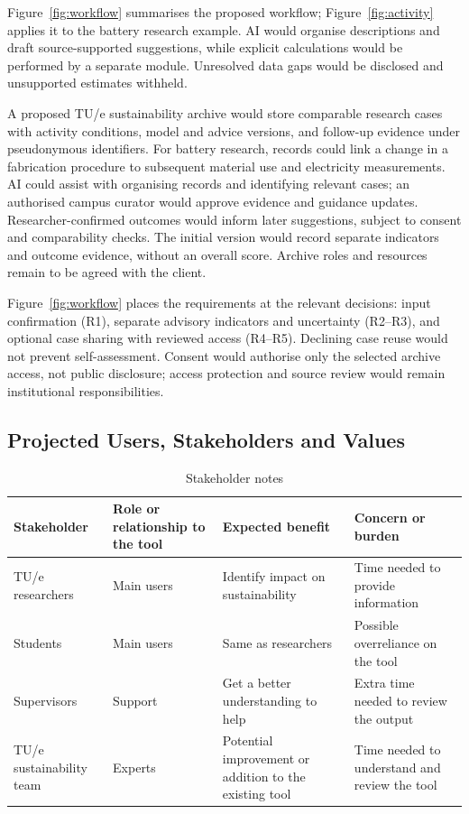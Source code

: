 Figure~\ref{fig:workflow} summarises the proposed workflow; Figure~\ref{fig:activity} applies it to the battery research example. AI would organise descriptions and draft source-supported suggestions, while explicit calculations would be performed by a separate module. Unresolved data gaps would be disclosed and unsupported estimates withheld.

A proposed TU/e sustainability archive would store comparable research cases with activity conditions, model and advice versions, and follow-up evidence under pseudonymous identifiers. For battery research, records could link a change in a fabrication procedure to subsequent material use and electricity measurements. AI could assist with organising records and identifying relevant cases; an authorised campus curator would approve evidence and guidance updates. Researcher-confirmed outcomes would inform later suggestions, subject to consent and comparability checks. The initial version would record separate indicators and outcome evidence, without an overall score. Archive roles and resources remain to be agreed with the client.

Figure~\ref{fig:workflow} places the requirements at the relevant decisions: input confirmation (R1), separate advisory indicators and uncertainty (R2--R3), and optional case sharing with reviewed access (R4--R5). Declining case reuse would not prevent self-assessment. Consent would authorise only the selected archive access, not public disclosure; access protection and source review would remain institutional responsibilities.




\FloatBarrier
\subsection{Projected Users, Stakeholders and Values}
\begin{table}[ht]
\centering
\begin{tabularx}{\textwidth}{|X|X|X|X|}
\hline
\textbf{Stakeholder} & \textbf{Role or relationship to the tool} & 
\textbf{Expected benefit} & \textbf{Concern or burden} \\
\hline

TU/e researchers &
Main users &
Identify impact on sustainability &
Time needed to provide information \\
\hline

Students &
Main users &
Same as researchers &
Possible overreliance on the tool \\
\hline

Supervisors &
Support &
Get a better understanding to help &
Extra time needed to review the output 
\\
\hline

TU/e sustainability team &
Experts &
Potential improvement or addition to the existing tool &
Time needed to understand and review the tool \\
\hline

\end{tabularx}
\caption{Stakeholder notes}
\label{tab:stakeholders}
\end{table}

